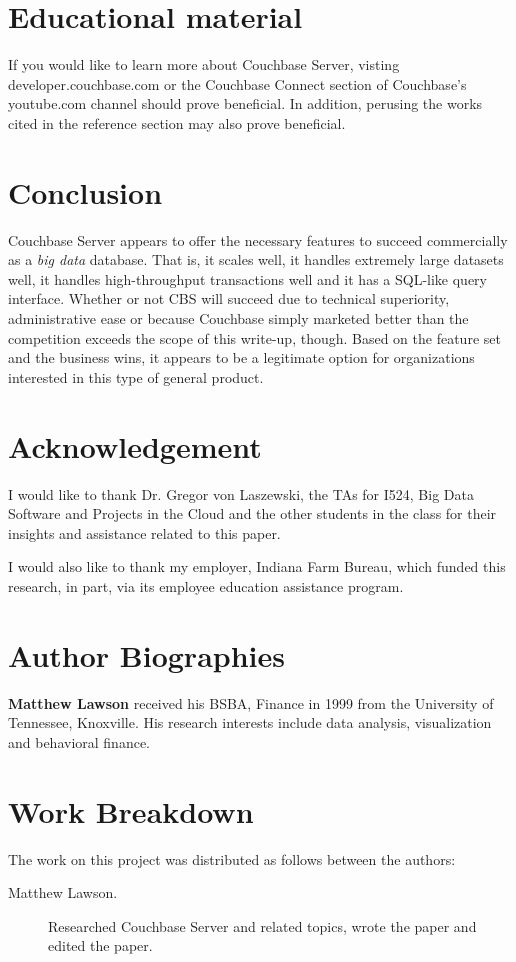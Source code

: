 \documentclass[9pt,twocolumn,twoside]{../../styles/osajnl}
\begin{document}
\section{Educational material}
If you would like to learn more about Couchbase Server, visting developer.couchbase.com or the Couchbase Connect section of Couchbase's youtube.com channel should prove beneficial.  In addition, perusing the works cited in the reference section may also prove beneficial.

\section{Conclusion}

Couchbase Server appears to offer the necessary features to succeed commercially as a \textit{big data} database.  That is, it scales well, it handles extremely large datasets well, it handles high-throughput transactions well and it has a SQL-like query interface.  Whether or not CBS will succeed due to technical superiority, administrative ease or because Couchbase simply marketed better than the competition exceeds the scope of this write-up, though.  Based on the feature set and the business wins, it appears to be a legitimate option for organizations interested in this type of general product.

\section{Acknowledgement}

I would like to thank Dr. Gregor von Laszewski, the TAs for I524, Big Data Software and Projects in the Cloud and the other students in the class for their insights and assistance related to this paper.

I would also like to thank my employer, Indiana Farm Bureau, which funded this research, in part, via its employee education assistance program.



 
\section*{Author Biographies}
\begingroup
\setlength\intextsep{0pt}
\begin{minipage}[t][3.2cm][t]{1.0\columnwidth} %
  \noindent
  {\bfseries Matthew Lawson} received his BSBA, Finance in 1999 from
  the University of Tennessee, Knoxville. His research interests include
  data analysis, visualization and behavioral finance.
\end{minipage}
\endgroup


\appendix

\section{Work Breakdown}

The work on this project was distributed as follows between the
authors:

\begin{description}
\item[Matthew Lawson.] Researched Couchbase Server and related topics, wrote the paper and edited the paper.
\end{description}
\end{document}
